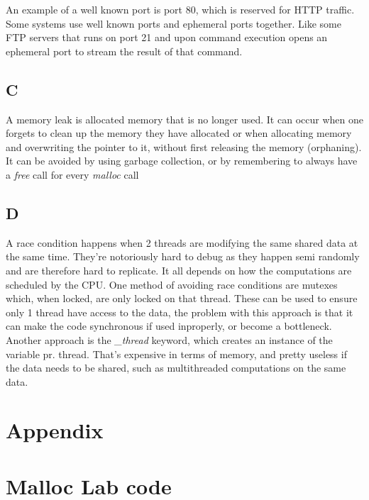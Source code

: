 \documentclass[11pt]{report}
\begin{document}
An example of a well known port is port 80, which is reserved for HTTP traffic. Some systems use well known ports and ephemeral ports together. Like some FTP servers that runs on port 21 and upon command execution opens an ephemeral port to stream the result of that command.

\section{C}
A memory leak is allocated memory that is no longer used. It can occur when one forgets to clean up the memory they have allocated or when allocating memory and overwriting the pointer to it, without first releasing the memory (orphaning). It can be avoided by using garbage collection, or by remembering to always have a \textit{free} call for every \textit{malloc} call

\section{D}
A race condition happens when 2 threads are modifying the same shared data at the same time. They're notoriously hard to debug as they happen semi randomly and are therefore hard to replicate. It all depends on how the computations are scheduled by the CPU. One method of avoiding race conditions are mutexes which, when locked, are only locked on that thread. These can be used to ensure only 1 thread have access to the data, the problem with this approach is that it can make the code synchronous if used inproperly, or become a bottleneck. Another approach is the \textit{\_thread} keyword, which creates an instance of the variable pr. thread. That's expensive in terms of memory, and pretty useless if the data needs to be shared, such as multithreaded computations on the same data.

\chapter{Appendix}
\appendix
\chapter{Malloc Lab code}
\end{document}
